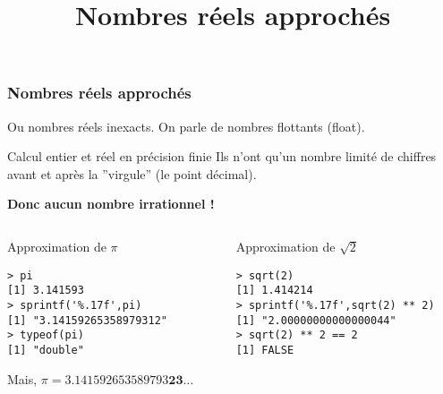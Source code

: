 \documentclass[10pt]{beamer}
\title{Nombres réels approchés}
\begin{document}
\maketitle

\begin{frame}[fragile]
  \frametitle{Nombres réels approchés}
  Ou nombres réels inexacts. On parle de \alert{nombres flottants} (float).

  \begin{alertblock}{Calcul entier et réel en précision finie}
    Ils n'ont qu'un nombre limité de chiffres avant et après la ”virgule” (le point décimal).
  \end{alertblock}


  \begin{center}
    \alert{\textbf{Donc aucun nombre irrationnel !}}
  \end{center}

\begin{columns}[t]
\begin{column}{0.45\textwidth}
  \begin{exampleblock}{Approximation de $\pi$}
    \begin{lstlisting}[style=block]
> pi
[1] 3.141593
> sprintf('%.17f',pi)
[1] "3.14159265358979312"
> typeof(pi)
[1] "double"
\end{lstlisting}
Mais, $\pi = 3.141592653589793\mathbf{23}\ldots$
  \end{exampleblock}
\end{column}

\begin{column}{0.55\textwidth}
  \begin{exampleblock}{Approximation de $\sqrt 2$}
    \begin{lstlisting}[style=block]
> sqrt(2)
[1] 1.414214
> sprintf('%.17f',sqrt(2) ** 2)
[1] "2.00000000000000044"
> sqrt(2) ** 2 == 2
[1] FALSE
\end{lstlisting}
\end{exampleblock}
\end{column}
\end{columns}
\end{frame}


\end{document}
